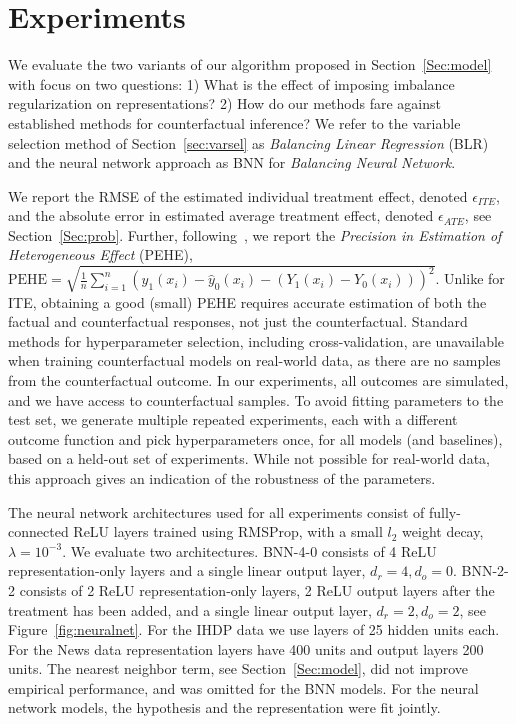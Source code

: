 \section{Experiments}
We evaluate the two variants of our algorithm proposed in Section~\ref{Sec:model} with focus on two questions: 1) What is the effect of imposing imbalance regularization on representations? 2) How do our methods fare against established methods for counterfactual inference? We refer to the variable selection method of Section~\ref{sec:varsel} as \emph{Balancing Linear Regression} ({\sc BLR}) and  the neural network approach as {\sc BNN} for \emph{Balancing Neural Network}.

We report the RMSE of the estimated individual treatment effect, denoted  $\epsilon_{ITE}$, and the absolute error in estimated average treatment effect, denoted $\epsilon_{ATE}$, see Section~\ref{Sec:prob}.
Further, following~\citet{hill2011bayesian}, we report the \emph{Precision in Estimation of Heterogeneous Effect} (PEHE), $\text{PEHE} = \sqrt{\frac{1}{n} \sum_{i=1}^n \left(\hat{y}_1(x_i) - \hat{y}_0(x_i) - (Y_1(x_i)-Y_0(x_i))\right)^2}$. Unlike for ITE, obtaining a good (small) PEHE requires accurate estimation of both the factual and counterfactual responses, not just the counterfactual.
Standard methods for hyperparameter selection, including cross-validation, are unavailable when training counterfactual models on real-world data, as there are no samples from the counterfactual outcome. In our experiments, all outcomes are simulated, and we have access to counterfactual samples. To avoid fitting parameters to the test set, we generate multiple repeated experiments, each with a different outcome function and pick hyperparameters once, for all models (and baselines), based on a held-out set of experiments. While not possible for real-world data, this approach gives an indication of the robustness of the parameters.

The neural network architectures used for all experiments consist of fully-connected ReLU layers trained using RMSProp, with a small $l_2$ weight decay, $\lambda=10^{-3}$. We evaluate two architectures. {\sc BNN-4-0} consists of 4 ReLU representation-only layers and a single linear output layer, $d_r = 4, d_o = 0$. {\sc BNN-2-2} consists of 2 ReLU representation-only layers, 2 ReLU output layers after the treatment has been added, and a single linear output layer, $d_r = 2, d_o=2$, see Figure~\ref{fig:neuralnet}. For the IHDP data we use layers of 25 hidden units each. For the News data representation layers have 400 units and output layers 200 units. The nearest neighbor term, see Section~\ref{Sec:model}, did not improve empirical performance, and was omitted for the BNN models. For the neural network models, the hypothesis and the representation were fit jointly.

